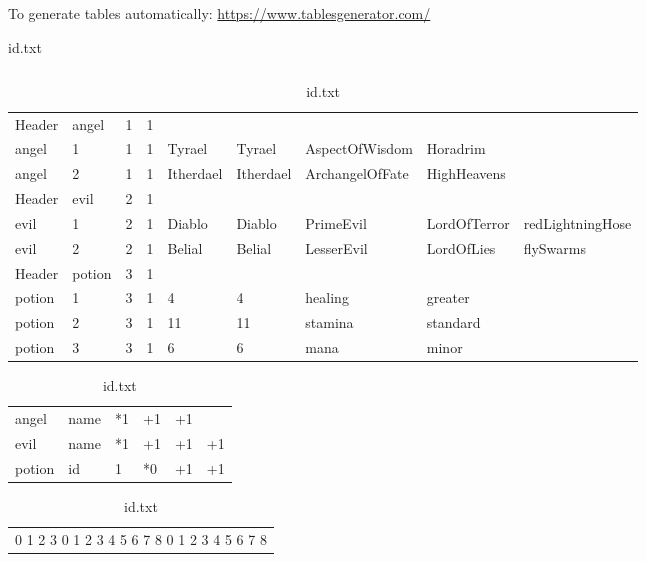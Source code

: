 \documentclass{article}
\begin{document}
\label{sec:structures}


To generate tables automatically: \url{https://www.tablesgenerator.com/}
\begin{table}[H]
\centering
\begin{tabular}{|l|c|c|}
\hline
\end{tabular}
\begin{table}[]
\caption{1.txt}
\begin{tabular}{lllllllll}
Header & angel  & 1 & 1 &           &           &                 &              &                  \\
angel  & 1      & 1 & 1 & Tyrael    & Tyrael    & AspectOfWisdom  & Horadrim     &                  \\
angel  & 2      & 1 & 1 & Itherdael & Itherdael & ArchangelOfFate & HighHeavens  &                  \\
Header & evil   & 2 & 1 &           &           &                 &              &                  \\
evil   & 1      & 2 & 1 & Diablo    & Diablo    & PrimeEvil       & LordOfTerror & redLightningHose \\
evil   & 2      & 2 & 1 & Belial    & Belial    & LesserEvil      & LordOfLies   & flySwarms        \\
Header & potion & 3 & 1 &           &           &                 &              &                  \\
potion & 1      & 3 & 1 & 4         & 4         & healing         & greater      &                  \\
potion & 2      & 3 & 1 & 11        & 11        & stamina         & standard     &                  \\
potion & 3      & 3 & 1 & 6         & 6         & mana            & minor        &                 
\end{tabular}
\caption{types.txt}
\begin{tabular}{llllll}
angel  & name & *1 & +1 & +1 &    \\
evil   & name & *1 & +1 & +1 & +1 \\
potion & id   & 1  & *0 & +1 & +1
\end{tabular}
\caption{id.txt}
\begin{tabular}{l}
0 1 2 3 0 1 2 3 4 5 6 7 8 0 1 2 3 4 5 6 7 8
\end{tabular}
\end{table}
\end{table}
\end{document}
